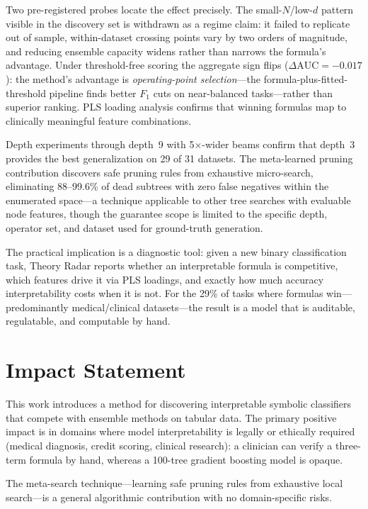 \documentclass[journal]{IEEEtran}
\begin{document}
Two pre-registered probes locate the effect precisely.  The
small-$N$/low-$d$ pattern visible in the discovery set is
withdrawn as a regime claim: it failed to replicate out of sample,
within-dataset crossing points vary by two orders of magnitude,
and reducing ensemble capacity widens rather than narrows the
formula's advantage.  Under threshold-free scoring the aggregate
sign flips ($\Delta\mathrm{AUC} = -0.017$): the method's
advantage is \emph{operating-point selection}---the
formula-plus-fitted-threshold pipeline finds better $F_1$ cuts on
near-balanced tasks---rather than superior ranking.  PLS loading
analysis confirms that winning formulas map to clinically
meaningful feature combinations.

Depth experiments through depth~9 with 5$\times$-wider beams confirm
that depth~3 provides the best generalization on 29 of 31 datasets.
The meta-learned pruning contribution discovers safe pruning rules
from exhaustive micro-search, eliminating 88--99.6\% of dead
subtrees with zero false negatives within the enumerated
space---a technique applicable to other tree searches with
evaluable node features, though the guarantee scope is limited
to the specific depth, operator set, and dataset used for
ground-truth generation.

The practical implication is a diagnostic tool: given a new binary
classification task, Theory Radar reports whether an interpretable
formula is competitive, which features drive it via PLS loadings,
and exactly how much accuracy interpretability costs when it is not.
For the 29\% of tasks where formulas win---predominantly
medical/clinical datasets---the result is a model that is auditable,
regulatable, and computable by hand.

\section*{Impact Statement}

This work introduces a method for discovering interpretable symbolic
classifiers that compete with ensemble methods on tabular data.  The
primary positive impact is in domains where model interpretability is
legally or ethically required (medical diagnosis, credit scoring,
clinical research): a clinician can verify a three-term formula by
hand, whereas a 100-tree gradient boosting model is opaque.

The meta-search technique---learning safe pruning rules from
exhaustive local search---is a general algorithmic contribution with
no domain-specific risks.
\end{document}
